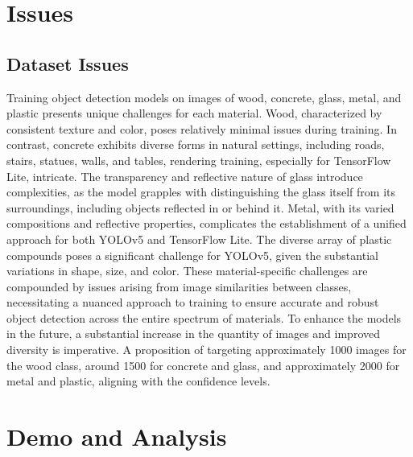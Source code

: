 \documentclass[conference]{IEEEtran}
\begin{document}
\section{Issues}
\subsection{Dataset Issues}
Training object detection models on images of wood, concrete, glass, metal, and plastic presents unique challenges for each material. Wood, characterized by consistent texture and color, poses relatively minimal issues during training. In contrast, concrete exhibits diverse forms in natural settings, including roads, stairs, statues, walls, and tables, rendering training, especially for TensorFlow Lite, intricate. The transparency and reflective nature of glass introduce complexities, as the model grapples with distinguishing the glass itself from its surroundings, including objects reflected in or behind it. Metal, with its varied compositions and reflective properties, complicates the establishment of a unified approach for both YOLOv5 and TensorFlow Lite. The diverse array of plastic compounds poses a significant challenge for YOLOv5, given the substantial variations in shape, size, and color. These material-specific challenges are compounded by issues arising from image similarities between classes, necessitating a nuanced approach to training to ensure accurate and robust object detection across the entire spectrum of materials. To enhance the models in the future, a substantial increase in the quantity of images and improved diversity is imperative. A proposition of targeting approximately 1000 images for the wood class, around 1500 for concrete and glass, and approximately 2000 for metal and plastic, aligning with the confidence levels.

\section{Demo and Analysis}
\end{document}
